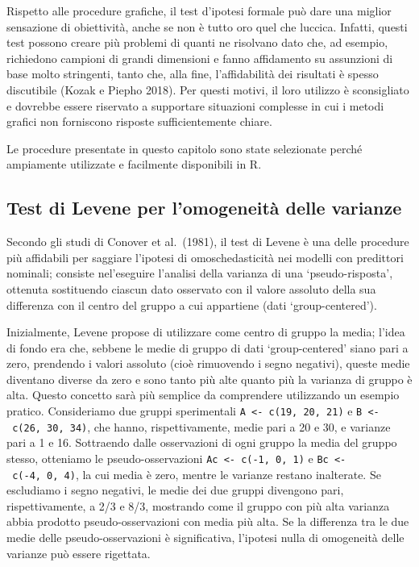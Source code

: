 \documentclass[
  12pt,
]{book}
\begin{document}
Rispetto alle procedure grafiche, il test d'ipotesi formale può dare una miglior sensazione di obiettività, anche se non è tutto oro quel che luccica. Infatti, questi test possono creare più problemi di quanti ne risolvano dato che, ad esempio, richiedono campioni di grandi dimensioni e fanno affidamento su assunzioni di base molto stringenti, tanto che, alla fine, l'affidabilità dei risultati è spesso discutibile (Kozak e Piepho 2018). Per questi motivi, il loro utilizzo è sconsigliato e dovrebbe essere riservato a supportare situazioni complesse in cui i metodi grafici non forniscono risposte sufficientemente chiare.

Le procedure presentate in questo capitolo sono state selezionate perché ampiamente utilizzate e facilmente disponibili in R.

\hypertarget{test-di-levene-per-lomogeneituxe0-delle-varianze}{%
\subsection{Test di Levene per l'omogeneità delle varianze}\label{test-di-levene-per-lomogeneituxe0-delle-varianze}}

Secondo gli studi di Conover et al.~(1981), il test di Levene è una delle procedure più affidabili per saggiare l'ipotesi di omoschedasticità nei modelli con predittori nominali; consiste nel'eseguire l'analisi della varianza di una `pseudo-risposta', ottenuta sostituendo ciascun dato osservato con il valore assoluto della sua differenza con il centro del gruppo a cui appartiene (dati `group-centered').

Inizialmente, Levene propose di utilizzare come centro di gruppo la media; l'idea di fondo era che, sebbene le medie di gruppo di dati `group-centered' siano pari a zero, prendendo i valori assoluto (cioè rimuovendo i segno negativi), queste medie diventano diverse da zero e sono tanto più alte quanto più la varianza di gruppo è alta. Questo concetto sarà più semplice da comprendere utilizzando un esempio pratico. Consideriamo due gruppi sperimentali \texttt{A\ \textless{}-\ c(19,\ 20,\ 21)} e \texttt{B\ \textless{}-\ c(26,\ 30,\ 34)}, che hanno, rispettivamente, medie pari a 20 e 30, e varianze pari a 1 e 16. Sottraendo dalle osservazioni di ogni gruppo la media del gruppo stesso, otteniamo le pseudo-osservazioni \texttt{Ac\ \textless{}-\ c(-1,\ 0,\ 1)} e \texttt{Bc\ \textless{}-\ c(-4,\ 0,\ 4)}, la cui media è zero, mentre le varianze restano inalterate. Se escludiamo i segno negativi, le medie dei due gruppi divengono pari, rispettivamente, a 2/3 e 8/3, mostrando come il gruppo con più alta varianza abbia prodotto pseudo-osservazioni con media più alta. Se la differenza tra le due medie delle pseudo-osservazioni è significativa, l'ipotesi nulla di omogeneità delle varianze può essere rigettata.
\end{document}
